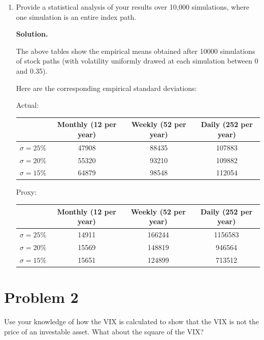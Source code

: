 \documentclass[12pt]{article}
\newenvironment{solution}{\vspace{0.2cm} \textbf{Solution.}}{}
\begin{document}
\begin{enumerate}[label=(\alph*)]
\begin{solution}
		\end{solution}
		
		\item Provide a statistical analysis of your results over 10,000 simulations, where one simulation is an entire index path.
		
		\begin{solution}
			
		The above tables show the empirical means obtained after 10000 simulations of stock paths (with volatility uniformly drawed at each simulation between 0 and 0.35).
		
		Here are the corresponding empirical standard deviations:
		
		Actual:
		
		\linethickness{1pt}
		\setlength{\arrayrulewidth}{1pt}
		\begin{tabular}{|c|c|c|c|}
			\hline
			\backslashbox{$\sigma$}{$\Delta t$} & Monthly (12 per year) & Weekly (52 per year) & Daily (252 per year) \\ \hline
			$\sigma = 25 \%$ & 47908 & 88435 & 107883 \\ \hline
			$\sigma = 20 \%$ & 55320 & 93210 & 109882 \\ \hline
			$\sigma = 15 \%$ & 64879 & 98548 & 112054 \\ \hline
		\end{tabular}
		
		Proxy:
		
		\linethickness{1pt}
		\setlength{\arrayrulewidth}{1pt}
		\begin{tabular}{|c|c|c|c|}
			\hline
			\backslashbox{$\sigma$}{$\Delta t$} & Monthly (12 per year) & Weekly (52 per year) & Daily (252 per year) \\ \hline
			$\sigma = 25 \%$ & 14911 & 166244  & 1156583 \\ \hline
			$\sigma = 20 \%$ & 15569 & 148819 & 946564 \\ \hline
			$\sigma = 15 \%$ & 15651 & 124899 & 713512 \\ \hline
		\end{tabular} 

		\end{solution}
	\end{enumerate}
	
\newpage

	\section*{Problem 2}
Use your knowledge of how the VIX is calculated to show that the VIX is not the price of an investable asset. What about the square of the VIX?
\end{document}
